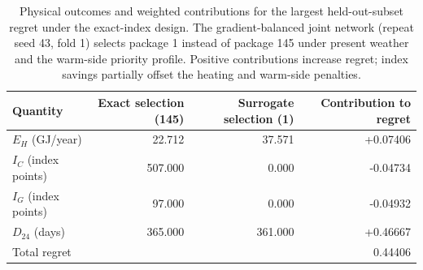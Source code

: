 \begin{table}[htbp]
\centering
\small
\caption{Regret tails pooled over the five main formulations. Regret uses each candidate set's exact-front normalisation. The 95th percentile uses linear interpolation. Mismatch rows exclude exact package agreements. Evaluations share data and profiles.}
\label{tab:s1-candidate-regret-tails}
\setlength{\tabcolsep}{4pt}
\end{table}

\begin{table}[htbp]
\centering
\small
\caption{Physical outcomes and weighted contributions for the largest held-out-subset regret under the exact-index design. The gradient-balanced joint network (repeat seed 43, fold 1) selects package 1 instead of package 145 under present weather and the warm-side priority profile. Positive contributions increase regret; index savings partially offset the heating and warm-side penalties.}
\label{tab:s1-worst-heldout-decision}
\begin{tabular}{lrrr}
\toprule
Quantity & Exact selection (145) & Surrogate selection (1) & Contribution to regret \\
\midrule
$E_H$ (GJ/year) & 22.712 & 37.571 & +0.07406 \\
$I_C$ (index points) & 507.000 & 0.000 & -0.04734 \\
$I_G$ (index points) & 97.000 & 0.000 & -0.04932 \\
$D_{24}$ (days) & 365.000 & 361.000 & +0.46667 \\
\midrule
Total regret & & & 0.44406 \\
\bottomrule
\end{tabular}
\end{table}

